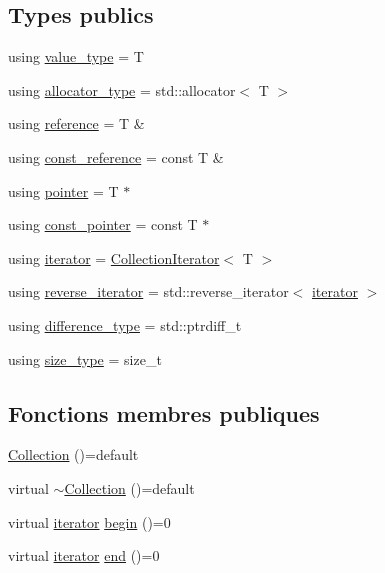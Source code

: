 \subsection*{Types publics}
\begin{DoxyCompactItemize}
\item 
using \hyperlink{class_collection_a30ecb2b5696f341f4b751019679c41e0}{value\+\_\+type} = T
\item 
using \hyperlink{class_collection_ac7974b0b552f0a94065aadc48ae53397}{allocator\+\_\+type} = std\+::allocator$<$ T $>$
\item 
using \hyperlink{class_collection_abbc291771b11c48cd2f297a0d9fe0449}{reference} = T \&
\item 
using \hyperlink{class_collection_abb8c0f6de5e322aa531837aab7358b89}{const\+\_\+reference} = const T \&
\item 
using \hyperlink{class_collection_a9a5b5d9b389c113364d527900c745efb}{pointer} = T $\ast$
\item 
using \hyperlink{class_collection_a79ea96d1fa145e340e907547d0053b81}{const\+\_\+pointer} = const T $\ast$
\item 
using \hyperlink{class_collection_a317dca4fdf1eb2e47643bb60c620f802}{iterator} = \hyperlink{class_collection_iterator}{Collection\+Iterator}$<$ T $>$
\item 
using \hyperlink{class_collection_ac3805407b2dc537e71db7af070b8d8a6}{reverse\+\_\+iterator} = std\+::reverse\+\_\+iterator$<$ \hyperlink{class_collection_a317dca4fdf1eb2e47643bb60c620f802}{iterator} $>$
\item 
using \hyperlink{class_collection_a60b36ef7aba0a88dff0e98fc2adb98a8}{difference\+\_\+type} = std\+::ptrdiff\+\_\+t
\item 
using \hyperlink{class_collection_a3f8b024f587aa20be530866da30948c4}{size\+\_\+type} = size\+\_\+t
\end{DoxyCompactItemize}
\subsection*{Fonctions membres publiques}
\begin{DoxyCompactItemize}
\item 
\hyperlink{class_collection_af6be61fb9648c2ac1ef7c8456b49a441}{Collection} ()=default
\item 
virtual \hyperlink{class_collection_ae9e3ec131717723e10152cb7ec3b0379}{$\sim$\+Collection} ()=default
\item 
virtual \hyperlink{class_collection_a317dca4fdf1eb2e47643bb60c620f802}{iterator} \hyperlink{class_collection_a4abc73f8e31a499a22b25d42b7a4fe8c}{begin} ()=0
\item 
virtual \hyperlink{class_collection_a317dca4fdf1eb2e47643bb60c620f802}{iterator} \hyperlink{class_collection_ab5b98f651d0f49cde1be067c69c52e89}{end} ()=0
\end{DoxyCompactItemize}


